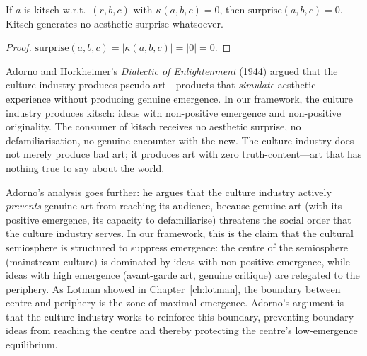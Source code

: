 \begin{theorem}
\label{thm:kitsch-no-surprise}
If $a$ is kitsch w.r.t.\ $(r, b, c)$ with $\kappa(a, b, c) = 0$, then $\mathrm{surprise}(a, b, c) = 0$.  Kitsch generates no aesthetic surprise whatsoever.
\end{theorem}

\begin{proof}
$\mathrm{surprise}(a, b, c) = |\kappa(a, b, c)| = |0| = 0$.
\end{proof}

\begin{interpretation}
\label{interp:adorno-culture-industry}
Adorno and Horkheimer's \textit{Dialectic of Enlightenment} (1944) argued that the culture industry produces pseudo-art---products that \emph{simulate} aesthetic experience without producing genuine emergence.  In our framework, the culture industry produces kitsch: ideas with non-positive emergence and non-positive originality.  The consumer of kitsch receives no aesthetic surprise, no defamiliarisation, no genuine encounter with the new.  The culture industry does not merely produce bad art; it produces art with zero truth-content---art that has nothing true to say about the world.

Adorno's analysis goes further: he argues that the culture industry actively \emph{prevents} genuine art from reaching its audience, because genuine art (with its positive emergence, its capacity to defamiliarise) threatens the social order that the culture industry serves.  In our framework, this is the claim that the cultural semiosphere is structured to suppress emergence: the centre of the semiosphere (mainstream culture) is dominated by ideas with non-positive emergence, while ideas with high emergence (avant-garde art, genuine critique) are relegated to the periphery.  As Lotman showed in Chapter~\ref{ch:lotman}, the boundary between centre and periphery is the zone of maximal emergence.  Adorno's argument is that the culture industry works to reinforce this boundary, preventing boundary ideas from reaching the centre and thereby protecting the centre's low-emergence equilibrium.
\end{interpretation}


